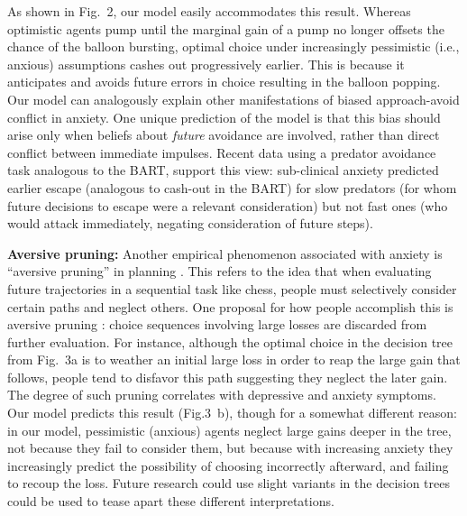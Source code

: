 \documentclass[11pt]{article} %
\begin{document}
As shown in Fig.~2, our model easily accommodates this result. Whereas optimistic agents pump until the marginal gain of a pump no longer offsets the chance of the balloon bursting, optimal choice under increasingly pessimistic (i.e., anxious) assumptions cashes out progressively earlier. This is because it anticipates and avoids future errors in choice resulting in the balloon popping. Our model can analogously explain other manifestations of biased approach-avoid conflict in anxiety\cite{bach2015,Mobbs2019}. One unique prediction of the model is that this bias should arise only when beliefs about \emph{future} avoidance are involved, rather than direct conflict between immediate impulses. Recent data \cite{Mobbs2019} using a predator avoidance task analogous to the BART, support this view: sub-clinical anxiety predicted earlier escape (analogous to cash-out in the BART) for slow predators (for whom future decisions to escape were a relevant consideration) but not fast ones (who would attack immediately, negating consideration of future steps).

\textbf{Aversive pruning:} Another empirical phenomenon associated with anxiety is ``aversive pruning'' in planning \cite{Huys2012, Lally2017}. This refers to the idea that when evaluating future trajectories in a sequential task like chess, people must selectively consider certain paths and neglect others. One proposal for how people accomplish this is aversive pruning \citep{Huys2012}: choice sequences involving large losses are discarded from further evaluation. For instance, although the optimal choice in the decision tree from Fig.~3a is to weather an initial large loss in order to reap the large gain that follows, people tend to disfavor this path suggesting they neglect the later gain. The degree of such pruning correlates with depressive \cite{Huys2012} and anxiety \cite{Lally2017} symptoms. Our model predicts this result (Fig.3~b), though for a somewhat different reason: in our model, pessimistic (anxious) agents neglect large gains deeper in the tree, not because they fail to consider them, but because with increasing anxiety they increasingly predict the possibility of choosing incorrectly afterward, and failing to recoup the loss. Future research could use slight variants in the decision trees could be used to tease apart these different interpretations.
\end{document}
